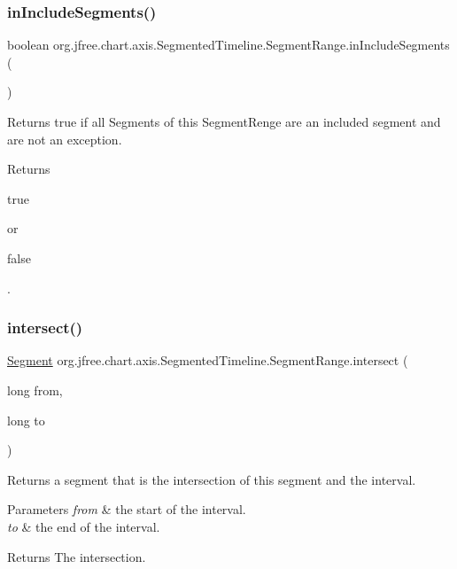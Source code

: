 \subsubsection{\texorpdfstring{in\+Include\+Segments()}{inIncludeSegments()}}
{\footnotesize\ttfamily boolean org.\+jfree.\+chart.\+axis.\+Segmented\+Timeline.\+Segment\+Range.\+in\+Include\+Segments (\begin{DoxyParamCaption}{ }\end{DoxyParamCaption})}

Returns true if all Segments of this Segment\+Renge are an included segment and are not an exception.

\begin{DoxyReturn}{Returns}

\begin{DoxyCode}
\textcolor{keyword}{true} 
\end{DoxyCode}
 or
\begin{DoxyCode}
\textcolor{keyword}{false} 
\end{DoxyCode}
 . 
\end{DoxyReturn}
\mbox{\label{classorg_1_1jfree_1_1chart_1_1axis_1_1_segmented_timeline_1_1_segment_range_a85cc5245bf9ae97def8129625f405e62}} 
\subsubsection{\texorpdfstring{intersect()}{intersect()}}
{\footnotesize\ttfamily \mbox{\hyperlink{classorg_1_1jfree_1_1chart_1_1axis_1_1_segmented_timeline_1_1_segment}{Segment}} org.\+jfree.\+chart.\+axis.\+Segmented\+Timeline.\+Segment\+Range.\+intersect (\begin{DoxyParamCaption}\item[{long}]{from,  }\item[{long}]{to }\end{DoxyParamCaption})}

Returns a segment that is the intersection of this segment and the interval.


\begin{DoxyParams}{Parameters}
{\em from} & the start of the interval. \\
\hline
{\em to} & the end of the interval.\\
\hline
\end{DoxyParams}
\begin{DoxyReturn}{Returns}
The intersection. 
\end{DoxyReturn}


